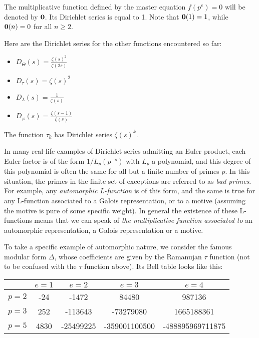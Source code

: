 \begin{example}
The multiplicative function defined by the master equation $f(p^e) = 0$ will be denoted by $\mathbf{0}$. Its Dirichlet series is equal to 1. Note that $\mathbf{0}(1) = 1$, while $\mathbf{0}(n) = 0$ for all $n \geq 2$.
\end{example}

\begin{example}
Here are the Dirichlet series for the other functions encountered so far:
\begin{itemize}
\item $D_{\Theta}(s) = \frac{\zeta(s)^2}{\zeta(2s)}$
\item $D_{\tau}(s) = \zeta(s)^2$
\item $D_{\lambda}(s) = \frac{1}{\zeta(s)}$
\item $D_{\varphi}(s) = \frac{\zeta(s - 1)}{\zeta(s)}$
\end{itemize}
The function $\tau_k$ has Dirichlet series $\zeta(s)^k$.
\end{example}



\begin{example}
In many real-life examples of Dirichlet series admitting an Euler product, each Euler factor is of the form ${1} / {L_p(p^{-s})}$ with $L_p$ a polynomial, and this degree of this polynomial is often the same for all but a finite number of primes $p$. In this situation, the primes in the finite set of exceptions are referred to as \emph{bad primes}. For example, any \emph{automorphic L-function} is of this form, and the same is true for any L-function associated to a Galois representation, or to a motive (assuming the motive is pure of some specific weight). In general the existence of these L-functions means that we can speak of \emph{the multiplicative function associated to} an automorphic representation, a Galois representation or a motive.
\end{example}

\begin{example}
To take a specific example of automorphic nature, we consider the famous modular form $\Delta$, whose coefficients are given by the Ramanujan $\tau$ function (not to be confused with the $\tau$ function above). Its Bell table looks like this:
\vskip10pt
\begin{center}
\begin{tabular}{| l | | c | c | c | c |}
\hline
& $e = 1$ & $e = 2$ & $e = 3$ & $e = 4$ \\
\hline
\hline
$p = 2$ & -24 & -1472 & 84480 & 987136 \\
\hline
$p = 3$ & 252 & -113643 & -73279080 & 1665188361 \\
\hline
$p = 5$ & 4830 & -25499225 & -359001100500 & -488895969711875 \\
\hline
\end{tabular}
\end{center}



\end{example}



